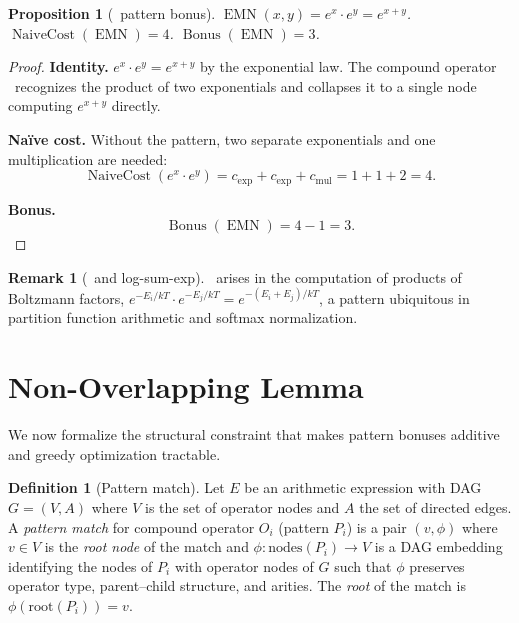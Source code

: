 \documentclass[12pt,a4paper]{article}
\newtheorem{proposition}[theorem]{Proposition}
\theoremstyle{definition}
\newtheorem{definition}[theorem]{Definition}
\newtheorem{remark}[theorem]{Remark}
\newcommand{\EMN}{\operatorname{EMN}}
\newcommand{\NC}{\operatorname{NaiveCost}}
\newcommand{\Bonus}{\operatorname{Bonus}}
\begin{document}
\begin{proposition}[\EMN\ pattern bonus]
\label{prop:P12}
$\EMN(x,y) = e^x \cdot e^y = e^{x+y}$.
$\NC(\EMN) = 4$. $\Bonus(\EMN) = 3$.
\end{proposition}

\begin{proof}
\textbf{Identity.}
$e^x \cdot e^y = e^{x+y}$ by the exponential law.
The compound operator \EMN\ recognizes the product of two exponentials
and collapses it to a single node computing $e^{x+y}$ directly.

\textbf{Na\"{i}ve cost.} Without the pattern, two separate exponentials
and one multiplication are needed:
\[
  \NC(e^x \cdot e^y) = c_{\exp} + c_{\exp} + c_{\mathrm{mul}}
                     = 1 + 1 + 2 = 4.
\]

\textbf{Bonus.}
\[
  \Bonus(\EMN) = 4 - 1 = 3.
\]
\end{proof}

\begin{remark}[\EMN\ and log-sum-exp]
\EMN\ arises in the computation of products of Boltzmann factors,
$e^{-E_i/kT} \cdot e^{-E_j/kT} = e^{-(E_i+E_j)/kT}$, a pattern
ubiquitous in partition function arithmetic and softmax normalization.
\end{remark}

\section{Non-Overlapping Lemma}
\label{sec:nonoverlap}

We now formalize the structural constraint that makes pattern bonuses
additive and greedy optimization tractable.

\begin{definition}[Pattern match]
\label{def:match}
Let $E$ be an arithmetic expression with DAG $G = (V, A)$ where $V$ is
the set of operator nodes and $A$ the set of directed edges.
A \emph{pattern match} for compound operator $O_i$ (pattern $P_i$) is a
pair $(v, \phi)$ where $v \in V$ is the \emph{root node} of the match
and $\phi: \mathrm{nodes}(P_i) \to V$ is a DAG embedding identifying
the nodes of $P_i$ with operator nodes of $G$ such that $\phi$
preserves operator type, parent--child structure, and arities.
The \emph{root} of the match is $\phi(\mathrm{root}(P_i)) = v$.
\end{definition}
\end{document}
